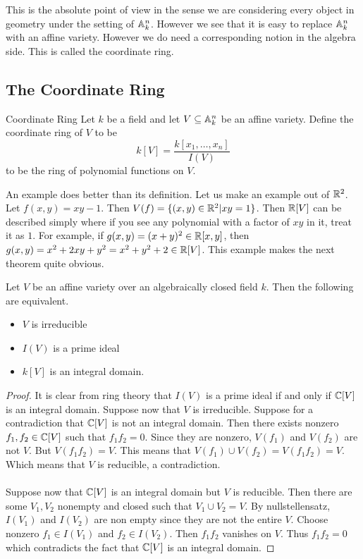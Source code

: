 \documentclass[a4paper]{article}
\begin{document}
This is the absolute point of view in the sense we are considering every object in geometry under the setting of $\mathbb{A}_k^n$. However we see that it is easy to replace $\mathbb{A}_k^n$ with an affine variety. However we do need a corresponding notion in the algebra side. This is called the coordinate ring. 

\subsection{The Coordinate Ring}
\begin{defn}{Coordinate Ring}{} Let $k$ be a field and let $V\subseteq\mathbb{A}_k^n$ be an affine variety. Define the coordinate ring of $V$ to be $$k[V]=\frac{k[x_1,\dots,x_n]}{I(V)}$$ to be the ring of polynomial functions on $V$. 
\end{defn}

An example does better than its definition. Let us make an example out of $\mathbb{R}^2$. Let $f(x,y)=xy-1$. Then $V(f)=\{(x,y)\in\mathbb{R}^2|xy=1\}$. Then $\mathbb{R}[V]$ can be described simply where if you see any polynomial with a factor of $xy$ in it, treat it as $1$. For example, if $g(x,y)=(x+y)^2\in\mathbb{R}[x,y]$, then $g(x,y)=x^2+2xy+y^2=x^2+y^2+2\in\mathbb{R}[V]$. This example makes the next theorem quite obvious. 

\begin{prp}{}{} Let $V$ be an affine variety over an algebraically closed field $k$. Then the following are equivalent. 
\begin{itemize}
\item $V$ is irreducible
\item $I(V)$ is a prime ideal
\item $k[V]$ is an integral domain. 
\end{itemize}\tcbline
\begin{proof}
It is clear from ring theory that $I(V)$ is a prime ideal if and only if $\mathbb{C}[V]$ is an integral domain. Suppose now that $V$ is irreducible. Suppose for a contradiction that $\mathbb{C}[V]$ is not an integral domain. Then there exists nonzero $f_1,f_2\in\mathbb{C}[V]$ such that $f_1f_2=0$. Since they are nonzero, $V(f_1)$ and $V(f_2)$ are not $V$. But $V(f_1f_2)=V$. This means that $V(f_1)\cup V(f_2)=V(f_1f_2)=V$. Which means that $V$ is reducible, a contradiction. \\~\\
Suppose now that $\mathbb{C}[V]$ is an integral domain but $V$ is reducible. Then there are some $V_1,V_2$ nonempty and closed such that $V_1\cup V_2=V$. By nullstellensatz, $I(V_1)$ and $I(V_2)$ are non empty since they are not the entire $V$. Choose nonzero $f_1\in I(V_1)$ and $f_2\in I(V_2)$. Then $f_1f_2$ vanishes on $V$. Thus $f_1f_2=0$ which contradicts the fact that $\mathbb{C}[V]$ is an integral domain. 
\end{proof}
\end{prp}
\end{document}

